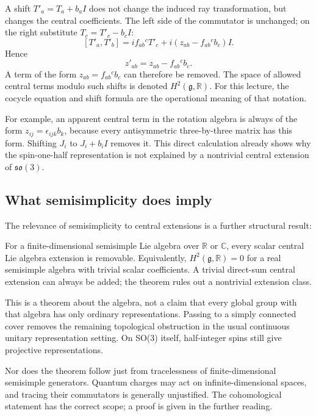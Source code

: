 \documentclass[11pt]{article}
\newcommand{\R}{\mathbb{R}}
\newcommand{\C}{\mathbb C}
\newcommand{\lieg}{\mathfrak g}
\newcommand{\so}{\mathfrak{so}}
\begin{document}
A shift \(T'_a=T_a+b_aI\) does not change the induced ray transformation,
but changes the central coefficients. The left side of the commutator
is unchanged; on the right substitute \(T_c=T'_c-b_cI\):
\[
 [T'_a,T'_b]=if_{ab}{}^cT'_c+i(z_{ab}-f_{ab}{}^cb_c)I.
\]
Hence
\begin{equation}
 z'_{ab}=z_{ab}-f_{ab}{}^c b_c.
 \label{eq:central-shift}
\end{equation}
A term of the form \(z_{ab}=f_{ab}{}^cb_c\) can therefore be removed.
The space of allowed central terms modulo such shifts is denoted
\(H^2(\lieg,\R)\). For this lecture, the cocycle equation and shift
formula are the operational meaning of that notation.

For example, an apparent central term in the rotation algebra is always
of the form \(z_{ij}=\epsilon_{ijk}b_k\), because every antisymmetric
three-by-three matrix has this form. Shifting \(J_i\) to \(J_i+b_iI\)
removes it. This direct calculation already shows why the spin-one-half
representation is not explained by a nontrivial central extension of
\(\so(3)\).

\subsection{What semisimplicity does imply}
The relevance of semisimplicity to central extensions is a further
structural result:

\begin{keyidea}
For a finite-dimensional semisimple Lie algebra over \(\R\) or \(\C\),
every scalar central Lie algebra extension is removable. Equivalently,
\(H^2(\lieg,\R)=0\) for a real semisimple algebra with trivial scalar
coefficients. A trivial direct-sum central extension can always be added;
the theorem rules out a nontrivial extension class.
\end{keyidea}
This is a theorem about the algebra, not a claim that every global group
with that algebra has only ordinary representations. Passing to a simply
connected cover removes the remaining topological obstruction in the
usual continuous unitary representation setting. On SO(3) itself,
half-integer spins still give projective representations.

Nor does the theorem follow just from tracelessness of finite-dimensional
semisimple generators. Quantum charges may act on infinite-dimensional
spaces, and tracing their commutators is generally unjustified.
The cohomological statement has the correct scope; a proof is given in
the further reading.
\end{document}
